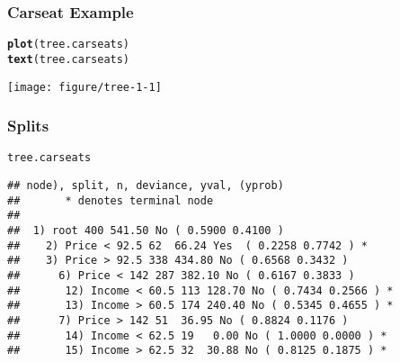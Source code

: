 \documentclass[handout]{beamer}\usepackage[]{graphicx}\usepackage[]{color}
\makeatletter
\def\maxwidth{ %
  \ifdim\Gin@nat@width>\linewidth
    \linewidth
  \else
    \Gin@nat@width
  \fi
}
\newcommand{\hlopt}[1]{\textcolor[rgb]{0,0,0}{#1}}%
\newcommand{\hlstd}[1]{\textcolor[rgb]{0.345,0.345,0.345}{#1}}%
\newcommand{\hlkwc}[1]{\textcolor[rgb]{0.333,0.667,0.333}{#1}}%
\newcommand{\hlkwd}[1]{\textcolor[rgb]{0.737,0.353,0.396}{\textbf{#1}}}%
\newenvironment{kframe}{%
 \def\at@end@of@kframe{}%
 \ifinner\ifhmode%
  \def\at@end@of@kframe{\end{minipage}}%
  \begin{minipage}{\columnwidth}%
 \fi\fi%
 \def\FrameCommand##1{\hskip\@totalleftmargin \hskip-\fboxsep
 \colorbox{shadecolor}{##1}\hskip-\fboxsep
     \hskip-\linewidth \hskip-\@totalleftmargin \hskip\columnwidth}%
 \MakeFramed {\advance\hsize-\width
   \@totalleftmargin\z@ \linewidth\hsize
   \@setminipage}}%
 {\par\unskip\endMakeFramed%
 \at@end@of@kframe}
\newenvironment{knitrout}{}{} %
\makeatother
\begin{document}
\begin{frame}[fragile] \frametitle{Carseat Example}
\begin{knitrout}
\color{fgcolor}\begin{kframe}
\begin{alltt}
 \hlkwd{plot}\hlstd{(tree.carseats)}
 \hlkwd{text}\hlstd{(tree.carseats)}
\end{alltt}
\end{kframe}

{\centering \texttt{[image: figure/tree-1-1]} 

}



\end{knitrout}

\end{frame}



\begin{frame}[fragile] \frametitle{Splits}
\begin{knitrout}
\color{fgcolor}\begin{kframe}
\begin{alltt}
\hlstd{tree.carseats}
\end{alltt}
\begin{verbatim}
## node), split, n, deviance, yval, (yprob)
##       * denotes terminal node
## 
##  1) root 400 541.50 No ( 0.5900 0.4100 )  
##    2) Price < 92.5 62  66.24 Yes  ( 0.2258 0.7742 ) *
##    3) Price > 92.5 338 434.80 No ( 0.6568 0.3432 )  
##      6) Price < 142 287 382.10 No ( 0.6167 0.3833 )  
##       12) Income < 60.5 113 128.70 No ( 0.7434 0.2566 ) *
##       13) Income > 60.5 174 240.40 No ( 0.5345 0.4655 ) *
##      7) Price > 142 51  36.95 No ( 0.8824 0.1176 )  
##       14) Income < 62.5 19   0.00 No ( 1.0000 0.0000 ) *
##       15) Income > 62.5 32  30.88 No ( 0.8125 0.1875 ) *
\end{verbatim}
\end{kframe}
\end{knitrout}
\end{frame}
\end{document}
